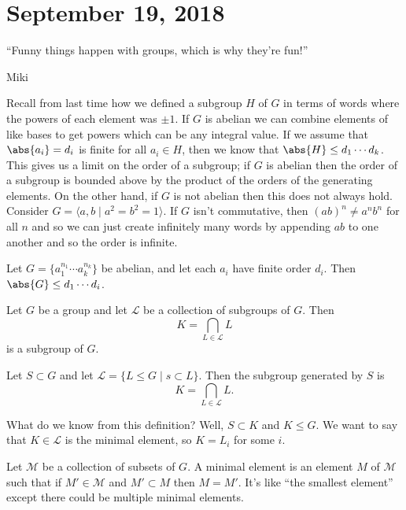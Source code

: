 \section{September 19, 2018}

\epigraph{``Funny things happen with groups, which is why they're fun!''}{Miki}

Recall from last time how we defined a subgroup $H$ of $G$ in terms of words where the powers of each element was $\pm 1$. If $G$ is abelian we can combine elements of like bases to get powers which can be any integral value. If we assume that $\abs{a_i} = d_i$ is finite for all $a_i \in H$, then we know that $\abs{H} \leq d_1 \cdots d_k$. This gives us a limit on the order of a subgroup; if $G$ is abelian then the order of a subgroup is bounded above by the product of the orders of the generating elements. On the other hand, if $G$ is not abelian then this does not always hold. Consider $G = \langle a,b \mid a^2 = b^2 = 1 \rangle$. If $G$ isn't commutative, then $(ab)^n \not= a^nb^n$ for all $n$ and so we can just create infinitely many words by appending $ab$ to one another and so the order is infinite.

\begin{lemma}
Let $G = \{a_1^{n_1} \cdots a_k^{n_k}\}$ be abelian, and let each $a_i$ have finite order $d_i$. Then $\abs{G} \leq d_1 \cdots d_i$.
\end{lemma}

\begin{proposition}
Let $G$ be a group and let $\mathcal{L}$ be a collection of subgroups of $G$. Then \[ K = \bigcap_{L \in \mathcal{L}} L \]
is a subgroup of $G$.
\end{proposition}

\begin{definition}[Subgroup]
Let $S \subset G$ and let $\mathcal{L} = \{L \leq G \mid s \subset L\}$. Then the subgroup generated by $S$ is \[ K = \bigcap_{L \in \mathcal{L}} L. \]
\end{definition}

What do we know from this definition? Well, $S \subset K$ and $K \leq G$. We want to say that $K \in \mathcal{L}$ is the minimal element, so $K = L_i$ for some $i$.

\begin{definition}
Let $\mathcal{M}$ be a collection of subsets of $G$. A minimal element is an element $M$ of $\mathcal{M}$ such that if $M' \in \mathcal{M}$ and $M' \subset M$ then $M = M'$. It's like ``the smallest element'' except there could be multiple minimal elements.
\end{definition}


